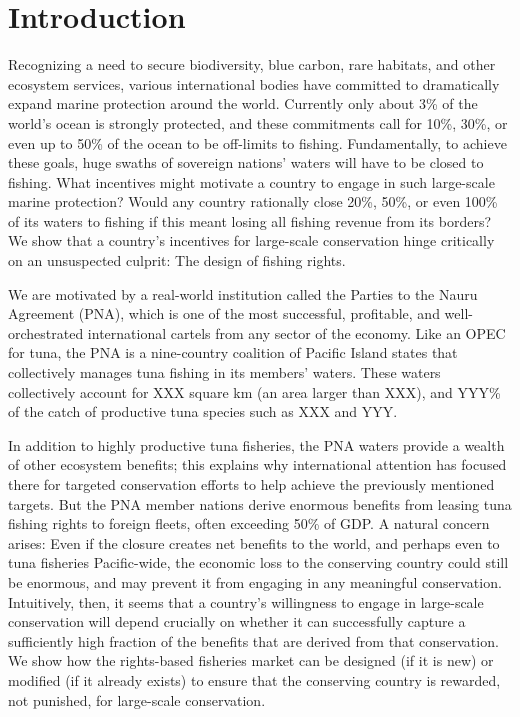 \documentclass[12pt]{article}
\begin{document}
\section{Introduction}\label{introduction}
Recognizing a need to secure biodiversity, blue carbon, rare habitats, and other ecosystem services, various international bodies have committed to dramatically expand marine protection around the world. Currently only about 3\% of the world's ocean is strongly protected, and these commitments call for 10\%, 30\%, or even up to 50\% of the ocean to be off-limits to fishing. Fundamentally, to achieve these goals, huge swaths of sovereign nations' waters will have to be closed to fishing. What incentives might motivate a country to engage in such large-scale marine protection?  Would any country rationally close 20\%, 50\%, or even 100\% of its waters to fishing if this meant losing all fishing revenue from its borders?  We show that a country's incentives for large-scale conservation hinge critically on an unsuspected culprit: The design of fishing rights.

We are motivated by a real-world institution called the Parties to the Nauru Agreement (PNA), which is one of the most successful, profitable, and well-orchestrated international cartels from any sector of the economy. Like an OPEC for tuna, the PNA is a nine-country coalition of Pacific Island states that collectively manages tuna fishing in its members' waters.  These waters collectively account for XXX square km (an area larger than XXX), and YYY\% of the catch of productive tuna species such as XXX and YYY.

In addition to highly productive tuna fisheries, the PNA waters provide a wealth of other ecosystem benefits; this explains why international attention has focused there for targeted conservation efforts to help achieve the previously mentioned targets. But the PNA member nations derive enormous benefits from leasing tuna fishing rights to foreign fleets, often exceeding 50\% of GDP. A natural concern arises: Even if the closure creates net benefits to the world, and perhaps even to tuna fisheries Pacific-wide, the economic loss to the conserving country could still be enormous, and may prevent it from engaging in any meaningful conservation. Intuitively, then, it seems that a country's willingness to engage in large-scale conservation will depend crucially on whether it can successfully capture a sufficiently high fraction of the benefits that are derived from that conservation.  We show how the rights-based fisheries market can be designed (if it is new) or modified (if it already exists) to ensure that the conserving country is rewarded, not punished, for large-scale conservation. 
\end{document}
